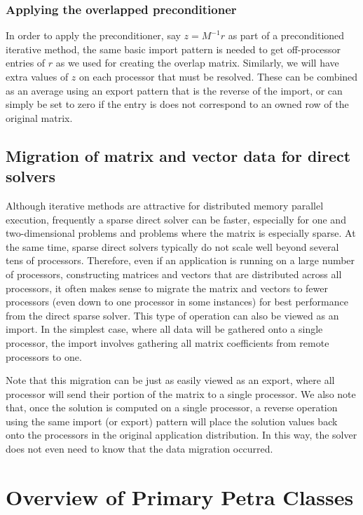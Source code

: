\documentclass[10pt,relax]{PetraObjectModel}
\begin{document}
\subsubsection{Applying the overlapped preconditioner}

In order to apply the preconditioner, say $z = M^{-1}r$ as part of a
preconditioned iterative method, the same basic import pattern is
needed to get off-processor entries of $r$ as we used for creating
the overlap matrix.  Similarly, we will have extra values of $z$ on
each processor that must be resolved.  These can be combined as an
average using an export pattern that is the reverse of the import,
or can simply be set to zero if the entry is does not correspond to
an owned row of the original matrix.

\subsection{Migration of matrix and vector data for direct solvers}

Although iterative methods are attractive for distributed memory
parallel execution, frequently a sparse direct solver can be faster,
especially for one and two-dimensional problems and problems where
the matrix is especially sparse.  At the same time, sparse direct
solvers typically do not scale well beyond several tens of
processors.  Therefore, even if an application is running on a large
number of processors, constructing matrices and vectors that are
distributed across all processors, it often makes sense to migrate
the matrix and vectors to fewer processors (even down to one
processor in some instances) for best performance from the direct
sparse solver.  This type of operation can also be viewed as an
import.  In the simplest case, where all data will be gathered onto
a single processor, the import involves gathering all matrix
coefficients from remote processors to one.

Note that this migration can be just as easily viewed as an export,
where all processor will send their portion of the matrix to a
single processor.  We also note that, once the solution is computed
on a single processor, a reverse operation using the same import (or
export) pattern will place the solution values back onto the
processors in the original application distribution.  In this way,
the solver does not even need to know that the data migration
occurred.


\section{Overview of Primary Petra Classes}
\label{sect:summary}
\end{document}

